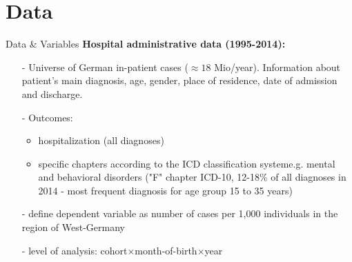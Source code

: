 \documentclass[aspectratio=169,handout]{beamer} %
\begin{document}
\section{Data}\label{DATA}
\begin{frame}{Data \& Variables}\label{VARIABLES}
\textbf{Hospital administrative data (1995-2014):} 
\begin{itemize}
\item[-] Universe of German in-patient cases ($\approx 18$ Mio/year). \newline Information about patient's main diagnosis, age, gender, place of residence, date of admission and discharge. \hyperlink{DESCRIPTIVES}{}
\item[-] Outcomes: 
\begin{itemize}
\item hospitalization (all diagnoses)
\item specific chapters according to the ICD classification system\newline e.g. mental and behavioral disorders ("F" chapter ICD-10, 12-18\% of all diagnoses in 2014 - most frequent diagnosis for age group 15 to 35 years)
\end{itemize}




 \hyperlink{ICD10 CLASSIFICATION}{}
\hyperlink{5 MOST COMMON DIAGNOSES}{}

\item[-] define dependent variable as number of cases per 1,000 individuals in the region of West-Germany

\item[-] level of analysis: cohort$\times$month-of-birth$\times$year

\end{itemize}
 
\end{frame}
\end{document}
